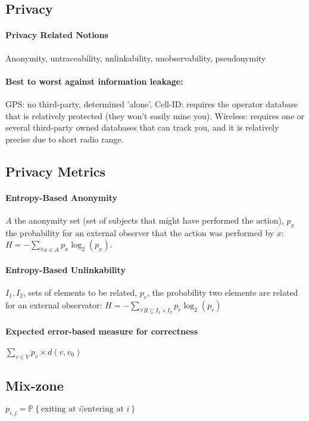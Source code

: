 \documentclass[6pt]{scrartcl}
\begin{document}
\begin{multicols}{4}
\section{Privacy}
\paragraph{Privacy Related Notions}Anonymity, untraceability, unlinkability, unobservability, pseudonymity
\paragraph{Best to worst against information leakage:}
GPS: no third-party, determined 'alone'.
Cell-ID: requires the operator database that is relatively protected (they won't easily mine you).
Wireless: requires one or several third-party owned databases that can track you, and it is relatively precise due to short radio range.

\subsection{Privacy Metrics}

\paragraph{Entropy-Based Anonymity}
$A$ the anonymity set (set of subjects that might have performed the action), $p_x$ the probability for an external observer that the action was performed by $x$: $H = - \sum_{\forall x \in A} p_x \log_2(p_x)$.

\paragraph{Entropy-Based Unlinkability}
$I_1,I_2$, sets of elements to be related, $p_r$, the probability two elements are related for an external observator: $H = - \sum_{\forall R \subseteq I_1 \times I_2}p_r \log_2(p_r)$

\paragraph{Expected error-based measure for correctness} $\sum_{v \in V} p_v \times d(v,v_0)$

\subsection{Mix-zone}
$p_{i,j} = \mathbb{P} \left\{ \text{exiting at } i | \text{entering at } i \right\}$


\end{multicols}
\end{document}
